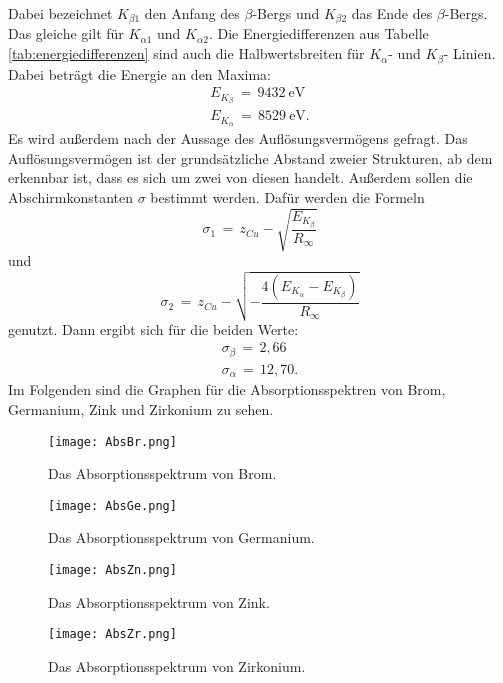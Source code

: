 \documentclass[
  bibliography=totoc,     %
  captions=tableheading,  %
  titlepage=firstiscover, %
]{scrartcl}
\begin{document}
\noindent
Dabei bezeichnet $K_{\beta 1}$ den Anfang des $\beta$-Bergs und $K_{\beta 2}$ das Ende des $\beta$-Bergs. Das gleiche gilt für $K_{\alpha 1}$ und $K_{\alpha 2}$. Die Energiedifferenzen aus Tabelle \ref{tab:energiedifferenzen} sind auch die Halbwertsbreiten für $K_{\alpha}$- und $K_{\beta}$- Linien. Dabei beträgt die Energie an den Maxima:
\begin{align*}
  E_{K_{\beta}}\,=\,\SI{9432}{\electronvolt} \\
  E_{K_{\alpha}}\,=\,\SI{8529}{\electronvolt}.
\end{align*}
Es wird außerdem nach der Aussage des Auflösungsvermögens gefragt. Das Auflösungsvermögen ist der grundsätzliche Abstand zweier Strukturen, ab dem erkennbar ist, dass es sich um zwei von diesen handelt. Außerdem sollen die Abschirmkonstanten $\sigma$ bestimmt werden. Dafür werden die Formeln
\begin{equation}
  \sigma_1\,=\,z_{Cu}-\sqrt{\frac{E_{K_{\beta}}}{R_{\infty}}}
\end{equation}
und
\begin{equation}
  \sigma_2\,=\,z_{Cu}-\sqrt{- \frac{4(E_{K_{\alpha}}-E_{K_{\beta}})}{R_{\infty}}}
\end{equation}
genutzt.
\noindent
Dann ergibt sich für die beiden Werte:
\begin{align*}
  \sigma_{\beta}\,=\,2,66 \\
  \sigma_{\alpha}\,=\,12,70.
\end{align*}
Im Folgenden sind die Graphen für die Absorptionsspektren von Brom, Germanium, Zink und Zirkonium zu sehen.
\begin{figure}[H]
  \centering
  \texttt{[image: AbsBr.png]}
  \caption{Das Absorptionsspektrum von Brom.}
  \label{fig:6027}
\end{figure}
\begin{figure}[H]
  \centering
  \texttt{[image: AbsGe.png]}
  \caption{Das Absorptionsspektrum von Germanium.}
  \label{fig:6028}
\end{figure}
\begin{figure}[H]
  \centering
  \texttt{[image: AbsZn.png]}
  \caption{Das Absorptionsspektrum von Zink.}
  \label{fig:6029}
\end{figure}
\begin{figure}[H]
  \centering
  \texttt{[image: AbsZr.png]}
  \caption{Das Absorptionsspektrum von Zirkonium.}
  \label{fig:60210}
\end{figure}
\end{document}
